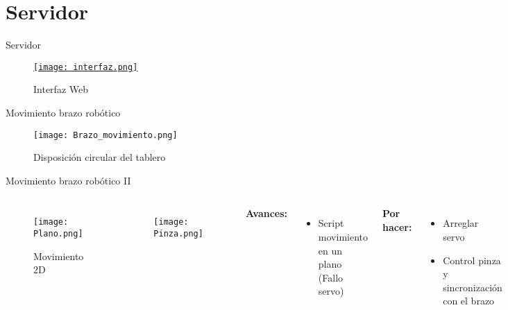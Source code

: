 \documentclass[11pt, xcolor = {dvipsnames}]{beamer}
\begin{document}
\section{Servidor}

\begin{frame}{Servidor}
  \begin{figure}
    \centering
    \href{http://www.alvarezrosa.com/proyecto}{\texttt{[image: interfaz.png]}}

    \caption{Interfaz Web}
  \end{figure}
\end{frame}


\begin{frame}{Movimiento brazo robótico}
  \begin{figure}
    \centering
    \texttt{[image: Brazo\_movimiento.png]}
    \caption{Disposición circular del tablero}
  \end{figure}
\end{frame}

\begin{frame}{Movimiento brazo robótico II}
  \begin{columns}
    \begin{figure}
      \centering
      \texttt{[image: Plano.png]}
      \caption{Movimiento 2D}
      \label{fig:my_label}
    \end{figure}
    \begin{figure}
      \centering
      \texttt{[image: Pinza.png]}
    \end{figure}
    \textbf{Avances:}
    \begin{itemize}
      \item Script movimiento en un plano (Fallo servo)
    \end{itemize}

    \textbf{Por hacer:}
    \begin{itemize}
      \item Arreglar servo
      \item Control pinza y sincronización con el brazo
    \end{itemize}
  \end{columns}
\end{frame}
\end{document}
